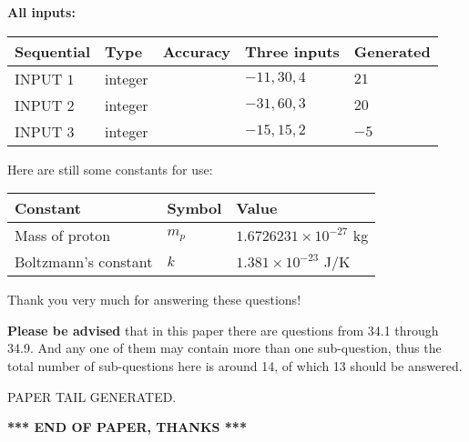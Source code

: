 \documentclass[12pt]{article}
\begin{document}
   
   
   
\noindent\vspace{0.1in}\hspace{-0.08in} {\textbf{\Large{All inputs: }}}
   
   
  
  
\noindent\begin{tabular}{|l|l|l|l|l|}
\hline
 Sequential & Type & Accuracy & Three inputs & Generated \\ 
\hline
 
 
  INPUT $           1$ & integer &  & $
 -11
 , 
 30
 , 
 4
 $ & $ 21 $ 
 \\  \hline  
 
 
  INPUT $           2$ & integer &  & $
 -31
 , 
 60
 , 
 3
 $ & $ 20 $ 
 \\  \hline  
 
 
  INPUT $           3$ & integer &  & $
 -15
 , 
 15
 , 
 2
 $ & $ -5 $ 
 \\  \hline  
 \end{tabular}
   
   
   
   
   
   
 \vspace{0.2in}
Here are still some constants for use:
 
 
\noindent\begin{tabular}{|l|l|l|}
\hline
Constant & Symbol & Value \\
\hline
 
Mass of proton &
$m_p$ &
 $ 1.6726231 \times 10^{-27} $
kg \\
\hline
 
Boltzmann's constant &
$k$ &
 $ 1.381 \times 10^{-23} $
J/K \\
\hline
 
\end{tabular}
 
Thank you very much for answering these questions!
 
{\textbf{\large{Please be advised}}} that in this paper there are questions from
34.1 through
34.9.
And any one of them may contain more than one sub-question, thus the total number
of sub-questions here is around 14, of which
13 should be answered.
 
   
   
\vspace{2.0in} PAPER TAIL GENERATED.
   
   
   
   
\vspace{1.0in} 
{\textbf{\large{ *** END OF PAPER, THANKS *** }}} 
   
\end{document}
